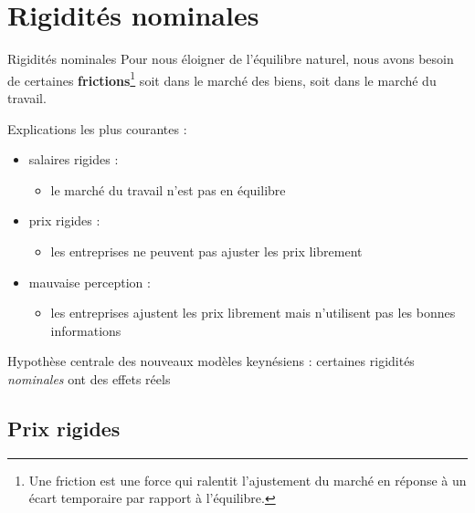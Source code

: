 \documentclass[
  ignorenonframetext,
  aspectratio=169,
]{beamer}
\providecommand{\tightlist}{%
  \setlength{\itemsep}{0pt}\setlength{\parskip}{0pt}}\usepackage{longtable,booktabs,array}
\begin{document}
\section{Rigidités nominales}\label{rigidituxe9s-nominales}

\begin{frame}{Rigidités nominales}
\label{rigidituxe9s-nominales-1}
Pour nous éloigner de l'équilibre naturel, nous avons besoin de
certaines
\textbf{frictions}\footnote{Une friction est une force qui ralentit l'ajustement du marché en réponse à un écart temporaire par rapport à l'équilibre.}
soit dans le marché des biens, soit dans le marché du travail.

Explications les plus courantes :

\begin{itemize}
\tightlist
\item
  salaires rigides :

  \begin{itemize}
  \tightlist
  \item
    le marché du travail n'est pas en équilibre
  \end{itemize}
\item
  prix rigides :

  \begin{itemize}
  \tightlist
  \item
    les entreprises ne peuvent pas ajuster les prix librement
  \end{itemize}
\item
  mauvaise perception :

  \begin{itemize}
  \tightlist
  \item
    les entreprises ajustent les prix librement mais n'utilisent pas les
    bonnes informations
  \end{itemize}
\end{itemize}

Hypothèse centrale des nouveaux modèles keynésiens : certaines rigidités
\emph{nominales} ont des effets réels
\end{frame}

\subsection{Prix rigides}\label{prix-rigides}
\end{document}
